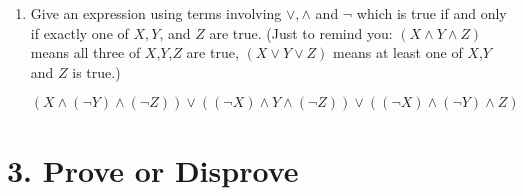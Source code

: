\documentclass{article}\usepackage{amsmath,amssymb,amsthm,tikz,tkz-graph,color,chngpage,soul,hyperref,csquotes,graphicx,floatrow, yfonts}\newcommand*{\QEDB}{\hfill\ensuremath{\square}}\newtheorem*{prop}{Proposition}\renewcommand{\theenumi}{\alph{enumi}}\usepackage[shortlabels]{enumitem}\usepackage[nobreak=true, framemethod=tikz]{mdframed}\usetikzlibrary{matrix,calc, automata, positioning}\MakeOuterQuote{"}\usepackage[margin=1in]{geometry} \newtheorem{theorem}{Theorem}
\begin{document}
\begin{enumerate}
\begin{enumerate}[(i)]
\end{enumerate}

\item Give an expression using terms involving $\lor,\land$ and $\neg$ which is true if and only if
exactly one of $X,Y$, and $Z$ are true.  (Just to remind you: $(X \land Y \land Z)$ means
all three of $X$,$Y$,$Z$ are true, $(X \lor Y \lor Z)$ means at least one of $X$,$Y$
and $Z$ is true.)
\begin{mdframed}
$ (X \land (\neg Y) \land (\neg Z)) \lor ((\neg X) \land Y \land (\neg Z)) \lor ((\neg X) \land (\neg Y) \land Z) $
\end{mdframed}

\end{enumerate}

\pagebreak

\section*{3. Prove or Disprove}
\end{document}

